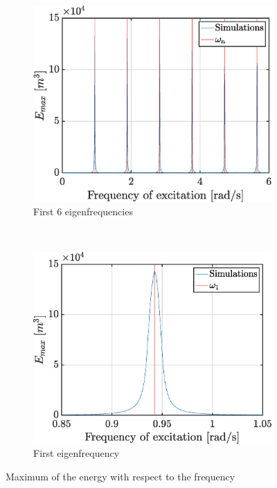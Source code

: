 \documentclass[a4paper,12pt,twoside]{article}
\begin{document}
    \begin{figure}[h!]
     \begin{subfigure}{0.5\textwidth}
      \includegraphics[width=\textwidth]{graphs/Eom.eps}
      \caption{First 6 eigenfrequencies}
      \label{fig:Eom_o}
     \end{subfigure}
     ~
     \begin{subfigure}{0.5\textwidth}
      \includegraphics[width=\textwidth]{graphs/Eomzoom.eps}
      \caption{First eigenfrequency}
      \label{fig:Eom_z}
     \end{subfigure}
     \caption{Maximum of the energy with respect to the frequency}
     \label{fig:Eom}
    \end{figure}
    
\end{document}
